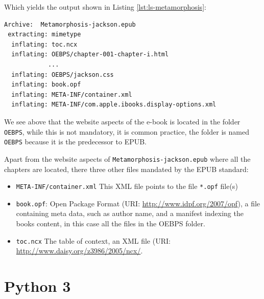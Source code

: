 \documentclass[]{report}   %
\begin{document}
Which yields the output shown in Listing \ref{lst:ls-metamorphosis}:

\begin{minipage}{\linewidth}
\begin{lstlisting}[language=bash, label={lst:ls-metamorphosis}, 
				   caption={Metamorphisis EPUB file structure}]
Archive:  Metamorphosis-jackson.epub
 extracting: mimetype
  inflating: toc.ncx
  inflating: OEBPS/chapter-001-chapter-i.html
            ...
  inflating: OEBPS/jackson.css
  inflating: book.opf
  inflating: META-INF/container.xml
  inflating: META-INF/com.apple.ibooks.display-options.xml
\end{lstlisting}
\end{minipage}

We see above that the website aspects of the e-book is located in the folder
\texttt{OEBPS}, while this is not mandatory, it is common practice, the folder
is named \texttt{OEBPS} because it is the predecessor to EPUB.

Apart from the website aspects of \texttt{Metamorphosis-jackson.epub} where all
the chapters are located, there three other files mandated by the EPUB
standard\cite{epub301}:
\begin{itemize}
	\item \texttt{META-INF/container.xml} This XML file points to the file \texttt{*.opf} file(s)
    \item \texttt{book.opf}: Open Package Format (URI:
          \url{http://www.idpf.org/2007/opf}), a file containing meta data, such as
          author name, and a manifest indexing the books content, in this case all
          the files in the OEBPS folder.
    \item \texttt{toc.ncx} The table of context, an XML file (URI:
          \url{http://www.daisy.org/z3986/2005/ncx/}.
\end{itemize}

\section{Python 3}
\end{document}
